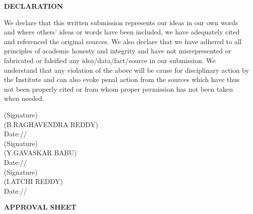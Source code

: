 \documentclass[10pt]{report}
\begin{document}
\newpage
\begin{center}
\Huge \textbf{DECLARATION}
\end{center}
\vspace{1.0cm}
\linespread{1.5}
\large{
We declare that this written submission represents our ideas in our own words and where others' ideas
or words have been included, we have adequately cited and referenced the original sources. We also
declare that we have adhered to all principles of academic honesty and integrity and have not
misrepresented or fabricated or falsified any idea/data/fact/source in our submission. We understand
that any violation of the above will be cause for disciplinary action by the Institute and can also evoke
penal action from the sources which have thus not been properly cited or from whom proper permission
has not been taken when needed.}
\vspace{2.0cm}
\begin{flushright}
(Signature)\\
\large{(B.RAGHAVENDRA REDDY)}\\
\large{Date:\hspace*{1.0cm}/\hspace*{1.0cm}/}\\[2.0cm]
(Signature)\\
\large{(Y.GAVASKAR BABU)}\\
\large{Date:\hspace*{1.0cm}/\hspace*{1.0cm}/}\\[2.0cm]
(Signature)\\
\large{(I.ATCHI REDDY)}\\
\large{Date:\hspace*{1.0cm}/\hspace*{1.0cm}/}\\[2.0cm]
\end{flushright}
\newpage
\newpage
\begin{center}
\Huge\textbf{APPROVAL SHEET}\\
\vspace{1.0cm}
\end{center}
\linespread{1.5}
\end{document}
